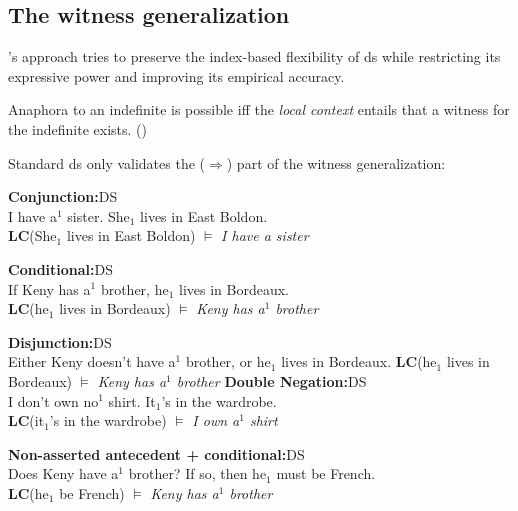 \documentclass[nols,twoside,nofonts,nobib,nohyper]{tufte-handout}
\theoremstyle{observation}
\theoremstyle{theorem}
\theoremstyle{corollary}
\theoremstyle{definition}
\begin{document}
\subsection{The witness generalization}

\citeauthor{Mandelkern2020a}'s approach tries to preserve the index-based flexibility of \ac{ds} while restricting its expressive power and improving its empirical accuracy.

\begin{tcolorbox}[title=The witness generalization]
Anaphora to an indefinite is possible iff the \textit{local context} entails that a witness for the indefinite exists. (\citealt{RothschildMandelkern2017})
\end{tcolorbox}

Standard \ac{ds} only validates the ($\Rightarrow$) part of the witness generalization:

\ex
\textbf{Conjunction:}\hfill\cmark DS\\
I have a$^{1}$ sister. She$_{1}$ lives in East Boldon.\\
\textbf{LC}(She$_{1}$ lives in East Boldon) $\vDash$ \emph{I have a sister}
\xe

\ex
\textbf{Conditional:}\hfill\cmark DS\\
If Keny has a$^{1}$ brother, he$_{1}$ lives in Bordeaux. \\
\textbf{LC}(he$_{1}$ lives in Bordeaux) $\vDash$ \emph{Keny has a$^{1}$ brother}
\xe

\ex
\textbf{Disjunction:}\hfill\xmark DS\\
Either Keny doesn't have a$^{1}$ brother, or he$_{1}$ lives in Bordeaux.
\textbf{LC}(he$_{1}$ lives in Bordeaux) $\vDash$ \emph{Keny has a$^{1}$ brother}
\xe
%
\ex
\textbf{Double Negation:}\hfill\xmark DS\\
I don't own no$^{1}$ shirt. It$_{1}$'s in the wardrobe.\\
\textbf{LC}(it$_{1}$'s in the wardrobe) $\vDash$ \emph{I own a$^{1}$ shirt}
\xe

\ex
\textbf{Non-asserted antecedent + conditional:}\hfill\xmark DS\\
Does Keny have a$^{1}$ brother? If so, then he$_{1}$ must be French. \\
\textbf{LC}(he$_{1}$ be French) $\vDash$ \emph{Keny has a$^{1}$ brother}
\xe
\end{document}

